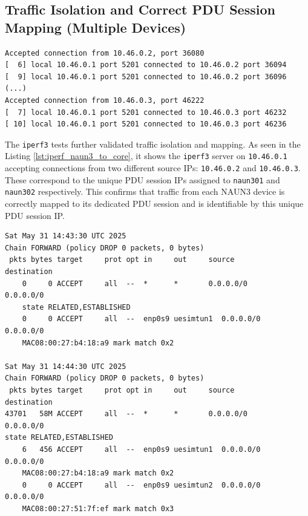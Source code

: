 \subsection{Traffic Isolation and Correct \acs{PDU} Session Mapping (Multiple Devices)}

\begin{lstlisting}[caption=\texttt{iperf3} server session receiveing from both clients at \texttt{naun301} and \texttt{naun302} via it's seperate \acs{PDU} channels,label={lst:iperf_naun3_to_core}]
Accepted connection from 10.46.0.2, port 36080
[  6] local 10.46.0.1 port 5201 connected to 10.46.0.2 port 36094
[  9] local 10.46.0.1 port 5201 connected to 10.46.0.2 port 36096
(...)
Accepted connection from 10.46.0.3, port 46222
[  7] local 10.46.0.1 port 5201 connected to 10.46.0.3 port 46232
[ 10] local 10.46.0.1 port 5201 connected to 10.46.0.3 port 46236
\end{lstlisting}

The \texttt{iperf3} tests further validated traffic isolation and mapping. As seen in the Listing \ref{lst:iperf_naun3_to_core}, it shows the \texttt{iperf3} server on \texttt{10.46.0.1} accepting connections from two different source \acp{IP}: \texttt{10.46.0.2} and \texttt{10.46.0.3}. These correspond to the unique \ac{PDU} session \acp{IP} assigned to \texttt{naun301} and \texttt{naun302} respectively. This confirms that traffic from each \ac{NAUN3} device is correctly mapped to its dedicated \ac{PDU} session and is identifiable by this unique \ac{PDU} session \ac{IP}.

\begin{lstlisting}[caption=\texttt{iptables} mapping rules and tables for segregating traffic,label={lst:iptable_mapping_rules}]
Sat May 31 14:43:30 UTC 2025
Chain FORWARD (policy DROP 0 packets, 0 bytes)
 pkts bytes target     prot opt in     out     source           destination         
    0     0 ACCEPT     all  --  *      *       0.0.0.0/0        0.0.0.0/0            
    state RELATED,ESTABLISHED
    0     0 ACCEPT     all  --  enp0s9 uesimtun1  0.0.0.0/0        0.0.0.0/0            
    MAC08:00:27:b4:18:a9 mark match 0x2

Sat May 31 14:44:30 UTC 2025
Chain FORWARD (policy DROP 0 packets, 0 bytes)
 pkts bytes target     prot opt in     out     source           destination         
43701   58M ACCEPT     all  --  *      *       0.0.0.0/0        0.0.0.0/0            
state RELATED,ESTABLISHED
    6   456 ACCEPT     all  --  enp0s9 uesimtun1  0.0.0.0/0        0.0.0.0/0            
    MAC08:00:27:b4:18:a9 mark match 0x2
    0     0 ACCEPT     all  --  enp0s9 uesimtun2  0.0.0.0/0        0.0.0.0/0            
    MAC08:00:27:51:7f:ef mark match 0x3
\end{lstlisting}

